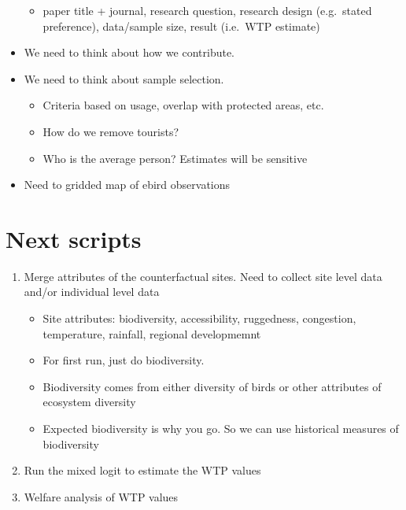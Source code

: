 \documentclass[
  letterpaper,
]{article}
\providecommand{\tightlist}{%
  \setlength{\itemsep}{0pt}\setlength{\parskip}{0pt}}\usepackage{longtable,booktabs,array}
\begin{document}
\begin{tcolorbox}
\begin{itemize}
  \begin{itemize}
  \tightlist
  \item
    paper title + journal, research question, research design
    (e.g.~stated preference), data/sample size, result (i.e.~WTP
    estimate)
  \end{itemize}
\item
  We need to think about how we contribute.
\item
  We need to think about sample selection.

  \begin{itemize}
  \tightlist
  \item
    Criteria based on usage, overlap with protected areas, etc.
  \item
    How do we remove tourists?
  \item
    Who is the average person? Estimates will be sensitive
  \end{itemize}
\item
  Need to gridded map of ebird observations
\end{itemize}

\section{Next scripts}\label{next-scripts}

\begin{enumerate}
\def\labelenumi{\arabic{enumi}.}
\setcounter{enumi}{3}
\tightlist
\item
  Merge attributes of the counterfactual sites. Need to collect site
  level data and/or individual level data

  \begin{itemize}
  \tightlist
  \item
    Site attributes: biodiversity, accessibility, ruggedness,
    congestion, temperature, rainfall, regional developmemnt
  \item
    For first run, just do biodiversity.
  \item
    Biodiversity comes from either diversity of birds or other
    attributes of ecosystem diversity
  \item
    Expected biodiversity is why you go. So we can use historical
    measures of biodiversity
  \end{itemize}
\item
  Run the mixed logit to estimate the WTP values
\item
  Welfare analysis of WTP values
\end{enumerate}

\end{tcolorbox}
\end{document}
